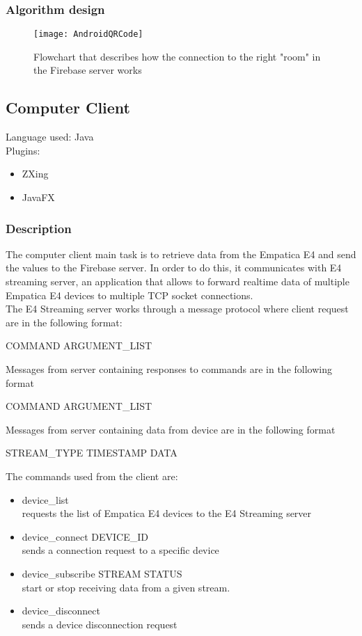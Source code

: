 \subsubsection{Algorithm design}
\begin{figure}[H]
	\centering
	\texttt{[image: AndroidQRCode]}
	\caption{Flowchart that describes how the connection to the right "room" in the Firebase server works}
\end{figure}
\subsection{Computer Client}
Language used: Java\\
Plugins:
\begin{itemize}
	\item ZXing
	\item JavaFX
\end{itemize}

\subsubsection{Description}
The computer client main task is to retrieve data from the Empatica E4 and send the values to the Firebase server. In order to do this, it communicates with E4 streaming server, an application that allows to forward realtime data of multiple Empatica E4 devices to multiple TCP socket connections.\\
The E4 Streaming server works through a message protocol where client request are in the following format:
\begin{center}
	COMMAND ARGUMENT\_LIST
\end{center}
Messages from server containing responses to commands are in the following format
\begin{center}
	COMMAND ARGUMENT\_LIST
\end{center}
Messages from server containing data from device are in the following format
\begin{center}
	STREAM\_TYPE TIMESTAMP DATA
\end{center}
The commands used from the client are:
\begin{itemize}
	\item device\_list\\
	requests the list of Empatica E4 devices to the E4 Streaming server
	\item device\_connect DEVICE\_ID\\
	sends a connection request to a specific device
	\item device\_subscribe STREAM STATUS\\
	start or stop receiving data from a given stream.
	\item device\_disconnect\\
	sends a device disconnection request
\end{itemize}
\pagebreak

